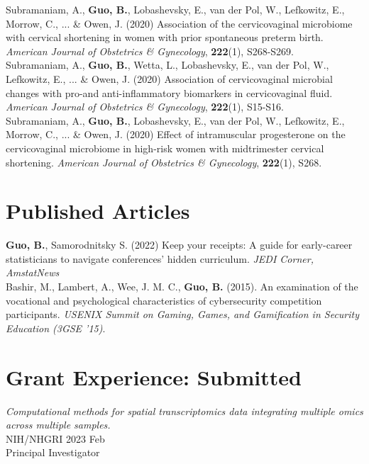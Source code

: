 Subramaniam, A., \textbf{Guo, B.}, Lobashevsky, E., van der Pol, W., Lefkowitz, E., Morrow, C., ... \& Owen, J.   (2020) Association of the cervicovaginal microbiome with cervical shortening in women with prior spontaneous preterm birth. \textit{American Journal of Obstetrics \& Gynecology}, {\bf 222}(1), S268-S269.\\

Subramaniam, A., \textbf{Guo, B.}, Wetta, L., Lobashevsky, E., van der Pol, W., Lefkowitz, E., ... \& Owen, J.  (2020) Association of cervicovaginal microbial changes with pro-and anti-inflammatory biomarkers in cervicovaginal fluid. \textit{American Journal of Obstetrics \& Gynecology}, {\bf 222}(1), S15-S16.\\

Subramaniam, A., \textbf{Guo, B.}, Lobashevsky, E., van der Pol, W., Lefkowitz, E., Morrow, C., ... \& Owen, J.  (2020) Effect of intramuscular progesterone on the cervicovaginal microbiome in high-risk women with midtrimester cervical shortening. \textit{American Journal of Obstetrics \& Gynecology}, {\bf 222}(1), S268.\\

\section{Published Articles}

\textbf{Guo, B.}, Samorodnitsky S. (2022) Keep your receipts: A guide for early-career statisticians to navigate conferences’ hidden curriculum. \textit{JEDI Corner, AmstatNews}\\

Bashir, M., Lambert, A., Wee, J. M. C., \textbf{Guo, B.} (2015). An examination of the vocational and psychological characteristics of cybersecurity competition participants. \textit{USENIX Summit on Gaming, Games, and Gamification in Security Education (3GSE '15)}.


\section{Grant Experience: Submitted}
\textit{Computational methods for spatial transcriptomics data integrating multiple omics across multiple samples.}\\[0.0em]
  NIH/NHGRI \hfill {}  2023 Feb\\
 Principal Investigator






